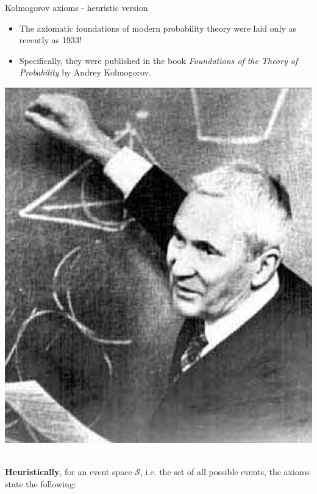 \documentclass[a4,11pt]{beamer}
\newlength{\wideitemsep}
\let\olditem\item
\renewcommand{\item}{\setlength{\itemsep}{\wideitemsep}\olditem}
\begin{document}
\begin{frame}[allowframebreaks]{Kolmogorov axioms - heuristic version}
    \begin{minipage}{.6\linewidth}
        \begin{itemize}
            \item The axiomatic foundations of modern probability theory were laid \textcolor{blueberry}{only as recently as 1933}!
            \item Specifically, they were published in the book \emph{Foundations of the Theory of Probability} by Andrey Kolmogorov.
        \end{itemize}
    \end{minipage}%
    \begin{minipage}{.4\linewidth}
        \includegraphics[width=\linewidth]{graphics/Kolmogorov.png}
    \end{minipage}\,\\\pagebreak
    \textbf{Heuristically}, for an event space $\mathcal{S}$, i.e. the set of all possible events, the axioms state the following:\bigskip\\
    

\end{frame}
\end{document}
